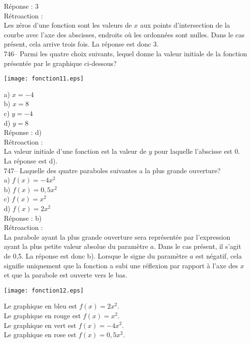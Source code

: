 ﻿\documentclass[letterpaper, 12pt]{article}
\begin{document}
R\'eponse : 3\\

R\'etroaction : \\
Les z\'eros d'une fonction sont les valeurs de $x$ aux points d'intersection
de la courbe avec l'axe des abscisses, endroits o\`u les ordonn\'ees sont
nulles.  Dans le cas pr\'esent, cela arrive trois fois.  La r\'eponse est
donc 3.\\

746-- Parmi les quatre choix suivants, lequel donne la valeur initiale de la
fonction pr\'esent\'ee par le graphique ci-dessous?\\
    \begin{center}
    \texttt{[image: fonction11.eps]}
    \end{center}
a) $x=-4$\\
b) $x=8$\\
c) $y=-4$\\
d) $y=8$\\

R\'eponse : d)\\

R\'etroaction : \\
La valeur initiale d'une fonction est la valeur de $y$ pour laquelle
l'abscisse est 0.  La r\'eponse est d).\\

747-- Laquelle des quatre paraboles suivantes a la plus grande ouverture?\\
a) $f(x)=-4x^{2}$\\
b) $f(x)=0,5x^{2}$\\
c) $f(x)=x^{2}$\\
d) $f(x)=2x^{2}$\\

R\'eponse : b)\\

R\'etroaction : \\
La parabole ayant la plus grande ouverture sera repr\'esent\'ee par
l'expression ayant la plus petite valeur absolue du param\`etre $a$. Dans le
cas pr\'esent, il s'agit de 0,5. La r\'eponse est donc b). Lorsque le signe
du param\`etre $a$ est n\'egatif, cela signifie uniquement que la fonction a
subi une r\'eflexion par rapport \`a l'axe des $x$ et que la parabole est
ouverte vers le bas.\\
    \begin{center}
    \texttt{[image: fonction12.eps]}
    \end{center}
Le graphique en bleu est $f(x)=2x^{2}$.\\
Le graphique en rouge est $f(x)=x^{2}$.\\
Le graphique en vert est $f(x)=-4x^{2}$.\\
Le graphique en rose est $f(x)=0,5x^{2}$.\\
\end{document}
